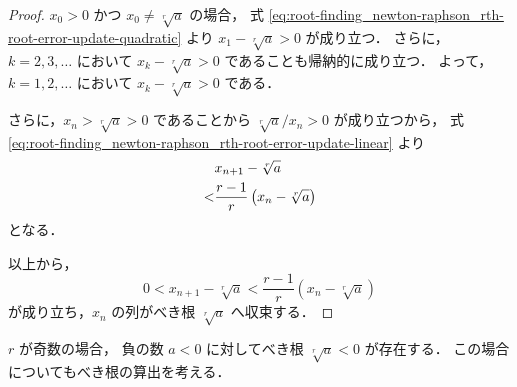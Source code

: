 \begin{proof}
    $x_0 > 0$ かつ $x_0 \neq \sqrt[r]{a}$ の場合，
    式 \eqref{eq:root-finding_newton-raphson_rth-root-error-update-quadratic} より
    $x_1 - \sqrt[r]{a} > 0$ が成り立つ．
    さらに，$k = 2, 3, \ldots$ において $x_k - \sqrt[r]{a} > 0$ であることも帰納的に成り立つ．
    よって，$k = 1, 2, \ldots$ において $x_k - \sqrt[r]{a} > 0$ である．

    さらに，$x_n > \sqrt[r]{a} > 0$ であることから
    $\sqrt[r]{a} / x_n > 0$ が成り立つから，
    式 \eqref{eq:root-finding_newton-raphson_rth-root-error-update-linear} より
    \begin{align}
          & x_{n+1} - \sqrt[r]{a}                          \notag \\
        < & \frac{r - 1}{r} \left(x_n - \sqrt[r]{a}\right)
    \end{align}
    となる．

    以上から，
    \begin{equation}
        0 < x_{n+1} - \sqrt[r]{a} < \frac{r - 1}{r} \left(x_n - \sqrt[r]{a}\right)
        \label{eq:root-finding_newton-raphson_rth-root-error-convergence}
    \end{equation}
    が成り立ち，$x_n$ の列がべき根 $\sqrt[r]{a}$ へ収束する．
\end{proof}

$r$ が奇数の場合，
負の数 $a < 0$ に対してべき根 $\sqrt[r]{a} < 0$ が存在する．
この場合についてもべき根の算出を考える．

